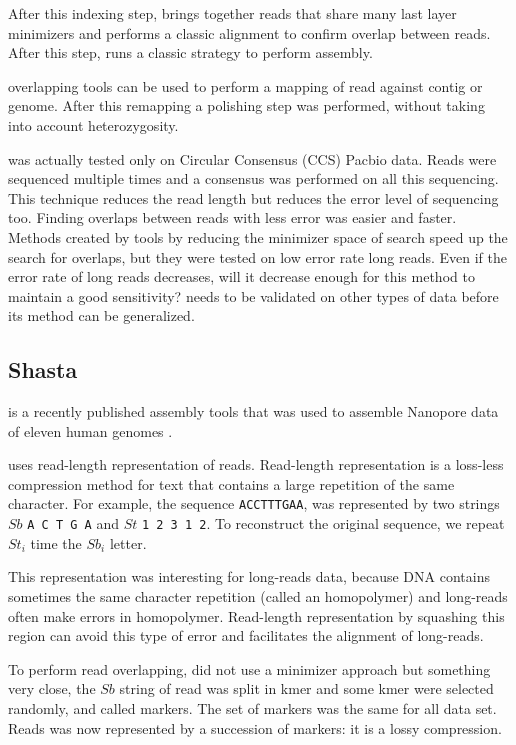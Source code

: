 \documentclass[main]{subfiles}
\begin{document}
After this indexing step, \shimmer brings together reads that share many last layer minimizers and performs a classic alignment to confirm overlap between reads. After this step, \peregrine runs a classic \OLC strategy to perform assembly.

\shimmer overlapping tools can be used to perform a mapping of read against contig or genome. After this remapping a polishing step was performed, without taking into account heterozygosity.

\peregrine was actually tested only on Circular Consensus (CCS) Pacbio data. Reads were sequenced multiple times and a consensus was performed on all this sequencing. This technique reduces the read length but reduces the error level of sequencing too. Finding overlaps between reads with less error was easier and faster. Methods created by \peregrine tools by reducing the minimizer space of search speed up the search for overlaps, but they were tested on low error rate long reads. Even if the error rate of long reads decreases, will it decrease enough for this method to maintain a good sensitivity? \peregrine needs to be validated on other types of data before its method can be generalized.

\subsection{Shasta}

\newcommand{\shasta}{}

\shasta is a recently published assembly tools that was used to assemble Nanopore data of eleven human genomes \cite{Shasta}.

\shasta uses read-length representation of reads. Read-length representation is a loss-less compression method for text that contains a large repetition of the same character. For example, the sequence \texttt{ACCTTTGAA}, was represented by two strings $Sb$ \texttt{A C T G A} and $St$ \texttt{1 2 3 1 2}. To reconstruct the original sequence, we repeat $St_i$ time the $Sb_i$ letter.

This representation was interesting for long-reads data, because DNA contains sometimes the same character repetition (called an homopolymer) and long-reads often make errors in homopolymer. Read-length representation by squashing this region can avoid this type of error and facilitates the alignment of long-reads.

To perform read overlapping, \shasta did not use a minimizer approach but something very close, the $Sb$ string of read was split in kmer and some kmer were selected randomly, and called markers. The set of markers was the same for all data set. Reads was now represented by a succession of markers: it is a lossy compression.
\end{document}
